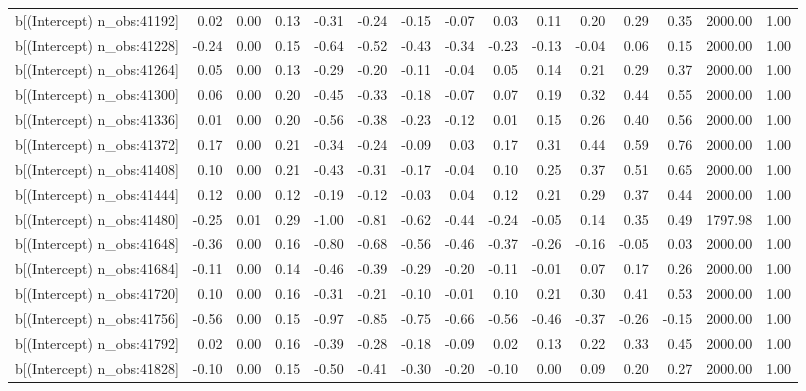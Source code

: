 \begin{table}[ht]
\begin{tabular}{rrrrrrrrrrrrrrr}
  b[(Intercept) n\_obs:41192] & 0.02 & 0.00 & 0.13 & -0.31 & -0.24 & -0.15 & -0.07 & 0.03 & 0.11 & 0.20 & 0.29 & 0.35 & 2000.00 & 1.00 \\ 
  b[(Intercept) n\_obs:41228] & -0.24 & 0.00 & 0.15 & -0.64 & -0.52 & -0.43 & -0.34 & -0.23 & -0.13 & -0.04 & 0.06 & 0.15 & 2000.00 & 1.00 \\ 
  b[(Intercept) n\_obs:41264] & 0.05 & 0.00 & 0.13 & -0.29 & -0.20 & -0.11 & -0.04 & 0.05 & 0.14 & 0.21 & 0.29 & 0.37 & 2000.00 & 1.00 \\ 
  b[(Intercept) n\_obs:41300] & 0.06 & 0.00 & 0.20 & -0.45 & -0.33 & -0.18 & -0.07 & 0.07 & 0.19 & 0.32 & 0.44 & 0.55 & 2000.00 & 1.00 \\ 
  b[(Intercept) n\_obs:41336] & 0.01 & 0.00 & 0.20 & -0.56 & -0.38 & -0.23 & -0.12 & 0.01 & 0.15 & 0.26 & 0.40 & 0.56 & 2000.00 & 1.00 \\ 
  b[(Intercept) n\_obs:41372] & 0.17 & 0.00 & 0.21 & -0.34 & -0.24 & -0.09 & 0.03 & 0.17 & 0.31 & 0.44 & 0.59 & 0.76 & 2000.00 & 1.00 \\ 
  b[(Intercept) n\_obs:41408] & 0.10 & 0.00 & 0.21 & -0.43 & -0.31 & -0.17 & -0.04 & 0.10 & 0.25 & 0.37 & 0.51 & 0.65 & 2000.00 & 1.00 \\ 
  b[(Intercept) n\_obs:41444] & 0.12 & 0.00 & 0.12 & -0.19 & -0.12 & -0.03 & 0.04 & 0.12 & 0.21 & 0.29 & 0.37 & 0.44 & 2000.00 & 1.00 \\ 
  b[(Intercept) n\_obs:41480] & -0.25 & 0.01 & 0.29 & -1.00 & -0.81 & -0.62 & -0.44 & -0.24 & -0.05 & 0.14 & 0.35 & 0.49 & 1797.98 & 1.00 \\ 
  b[(Intercept) n\_obs:41648] & -0.36 & 0.00 & 0.16 & -0.80 & -0.68 & -0.56 & -0.46 & -0.37 & -0.26 & -0.16 & -0.05 & 0.03 & 2000.00 & 1.00 \\ 
  b[(Intercept) n\_obs:41684] & -0.11 & 0.00 & 0.14 & -0.46 & -0.39 & -0.29 & -0.20 & -0.11 & -0.01 & 0.07 & 0.17 & 0.26 & 2000.00 & 1.00 \\ 
  b[(Intercept) n\_obs:41720] & 0.10 & 0.00 & 0.16 & -0.31 & -0.21 & -0.10 & -0.01 & 0.10 & 0.21 & 0.30 & 0.41 & 0.53 & 2000.00 & 1.00 \\ 
  b[(Intercept) n\_obs:41756] & -0.56 & 0.00 & 0.15 & -0.97 & -0.85 & -0.75 & -0.66 & -0.56 & -0.46 & -0.37 & -0.26 & -0.15 & 2000.00 & 1.00 \\ 
  b[(Intercept) n\_obs:41792] & 0.02 & 0.00 & 0.16 & -0.39 & -0.28 & -0.18 & -0.09 & 0.02 & 0.13 & 0.22 & 0.33 & 0.45 & 2000.00 & 1.00 \\ 
  b[(Intercept) n\_obs:41828] & -0.10 & 0.00 & 0.15 & -0.50 & -0.41 & -0.30 & -0.20 & -0.10 & 0.00 & 0.09 & 0.20 & 0.27 & 2000.00 & 1.00 \\ 

\end{tabular}
\end{table}
